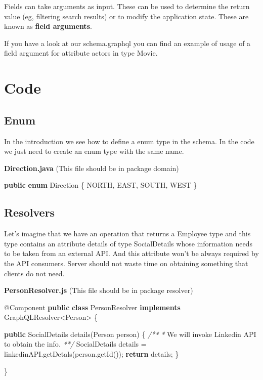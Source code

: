 \documentclass[]{book}
\newenvironment{Shaded}{\begin{snugshade}}{\end{snugshade}}
\newcommand{\KeywordTok}[1]{\textcolor[rgb]{0.13,0.29,0.53}{\textbf{#1}}}
\newcommand{\CommentTok}[1]{\textcolor[rgb]{0.56,0.35,0.01}{\textit{#1}}}
\newcommand{\FunctionTok}[1]{\textcolor[rgb]{0.00,0.00,0.00}{#1}}
\newcommand{\AttributeTok}[1]{\textcolor[rgb]{0.77,0.63,0.00}{#1}}
\newcommand{\NormalTok}[1]{#1}
\begin{document}
Fields can take arguments as input. These can be used to determine the
return value (eg, filtering search results) or to modify the application
state. These are known as \textbf{field arguments}.

If you have a look at our schema.graphql you can find an example of
usage of a field argument for attribute actors in type Movie.

\section{Code}\label{code}

\subsection{Enum}\label{enum}

In the introduction we see how to define a enum type in the schema. In
the code we just need to create an enum type with the same name.

\textbf{Direction.java} (This file should be in package domain)

\begin{Shaded}
\begin{Highlighting}[]
\KeywordTok{public} \KeywordTok{enum}\NormalTok{ Direction \{}
\NormalTok{    NORTH,}
\NormalTok{    EAST,}
\NormalTok{    SOUTH,}
\NormalTok{    WEST}
\NormalTok{\}}
\end{Highlighting}
\end{Shaded}

\subsection{Resolvers}\label{resolvers}

Let's imagine that we have an operation that returns a Employee type and
this type contains an attribute details of type SocialDetails whose
information needs to be taken from an external API. And this attribute
won't be always required by the API consumers. Server should not waste
time on obtaining something that clients do not need.

\textbf{PersonResolver.js} (This file should be in package resolver)

\begin{Shaded}
\begin{Highlighting}[]
\AttributeTok{@Component}
\KeywordTok{public} \KeywordTok{class}\NormalTok{ PersonResolver }\KeywordTok{implements}\NormalTok{ GraphQLResolver<Person> \{}
    
    \KeywordTok{public}\NormalTok{ SocialDetails }\FunctionTok{details}\NormalTok{(Person person) \{}
        \CommentTok{/**} 
        \CommentTok{*}\NormalTok{  We will invoke Linkedin API to obtain the info}\CommentTok{.}
        \CommentTok{**/}
\NormalTok{        SocialDetails details = linkedinAPI.}\FunctionTok{getDetals}\NormalTok{(person.}\FunctionTok{getId}\NormalTok{());}
        \KeywordTok{return}\NormalTok{ details;}
\NormalTok{    \}}
    
\NormalTok{\}}
\end{Highlighting}
\end{Shaded}
\end{document}
